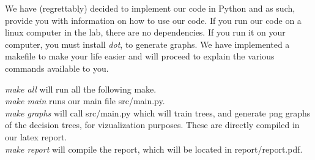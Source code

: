 We have (regrettably) decided to implement our code in Python and as such, provide you with information on how to use our code.
If you run our code on a linux computer in the lab, there are no dependencies. If you run it on your computer, you must install \emph{dot}, to generate graphs. We have implemented a makefile to make your life easier and will proceed to explain the various commands available to you.

\emph{make all} will run all the following make.\\

\emph{make main} runs our main file src/main.py.\\

\emph{make graphs} will call src/main.py which will train trees, and generate png graphs of the decision trees, for vizualization purposes.
These are directly compiled in our latex report.\\

\emph{make report} will compile the report, which will be located in report/report.pdf.\\




